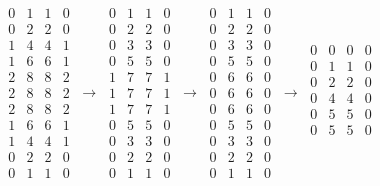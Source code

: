 \begin{equation*}
\begin{matrix}
0 & 1 & 1 & 0 \\ 
0 & 2 & 2 & 0 \\ 
1 & 4 & 4 & \boxed{1} \\ 
1 & 6 & 6 & 1 \\ 
2 & 8 & 8 & 2 \\ 
2 & 8 & 8 & 2 \\ 
2 & 8 & 8 & 2 \\ 
1 & 6 & 6 & 1 \\ 
1 & 4 & 4 & 1 \\ 
0 & 2 & 2 & 0 \\ 
0 & 1 & 1 & 0
\end{matrix}
\ \rightarrow \
\begin{matrix}
0 & 1 & 1 & 0 \\ 
0 & 2 & 2 & 0 \\ 
0 & 3 & 3 & 0 \\ 
0 & 5 & 5 & 0 \\ 
1 & 7 & 7 & \boxed{1} \\ 
1 & 7 & 7 & 1 \\ 
1 & 7 & 7 & 1 \\ 
0 & 5 & 5 & 0 \\ 
0 & 3 & 3 & 0 \\ 
0 & 2 & 2 & 0 \\ 
0 & 1 & 1 & 0
\end{matrix}
\ \rightarrow \
\begin{matrix}
0 & 1 & \boxed{1} & 0 \\ 
0 & 2 & 2 & 0 \\ 
0 & 3 & 3 & 0 \\ 
0 & 5 & 5 & 0 \\ 
0 & 6 & 6 & 0 \\ 
0 & 6 & 6 & 0 \\ 
0 & 6 & 6 & 0 \\ 
0 & 5 & 5 & 0 \\ 
0 & 3 & 3 & 0 \\ 
0 & 2 & 2 & 0 \\ 
0 & 1 & 1 & 0
\end{matrix}
\ \rightarrow \
\begin{matrix}
0 & 0 & 0 & 0 \\ 
0 & 1 & \boxed{1} & 0 \\ 
0 & 2 & 2 & 0 \\ 
0 & 4 & 4 & 0 \\ 
0 & 5 & 5 & 0 \\ 
0 & 5 & 5 & 0 \\ 

\end{matrix}
\end{equation*}
